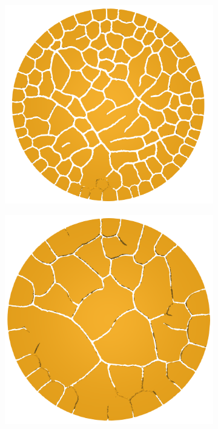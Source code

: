 \begin{figure}[!htb]
    \begin{subfigure}{0.31\textwidth}
        \includegraphics[width=\textwidth,scale=0.5]{past/figures/4mm_top.png}
    \end{subfigure}
    \begin{subfigure}{0.31\textwidth}
        \includegraphics[width=\textwidth,scale=0.5]{past/figures/8mm_top.png}

\end{subfigure}
\end{figure}

